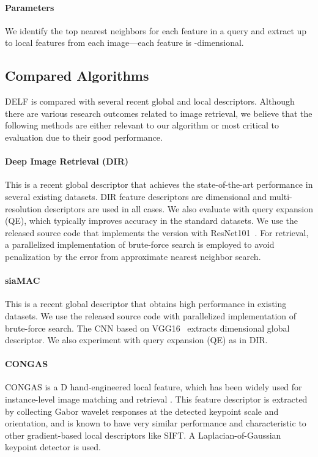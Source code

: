 \documentclass[10pt,twocolumn,letterpaper]{article}
\begin{document}
\vspace{-10pt}
\paragraph{Parameters} 
We identify the top  nearest neighbors for each feature in a query and extract up to  local features from each image---each feature is -dimensional.


\subsection{Compared Algorithms}
DELF is compared with several recent global and local descriptors.
Although there are various research outcomes related to image retrieval, we believe that the following methods are either relevant to our algorithm or most critical to evaluation due to their good performance.


\vspace{-10pt}
\paragraph{Deep Image Retrieval (DIR)~\cite{gordo2016deep}} 
This is a recent global descriptor that achieves the state-of-the-art performance in several existing datasets.  
DIR feature descriptors are  dimensional and multi-resolution descriptors are used in all cases.  
We also evaluate with query expansion (QE), which typically improves accuracy in the standard datasets.
We use the released source code that implements the version with ResNet101~\cite{he2015deep}. 
For retrieval, a parallelized implementation of brute-force search is employed to avoid penalization by the error from approximate nearest neighbor search.


\vspace{-10pt}
\paragraph{siaMAC~\cite{radenovic2016cnn}} 
This is a recent global descriptor that obtains high performance in existing datasets.  
We use the released source code with parallelized implementation of brute-force search.
The CNN based on VGG16~\cite{Simonyan15} extracts  dimensional global descriptor.  
We also experiment with query expansion (QE) as in DIR.


\vspace{-10pt}
\paragraph{CONGAS~\cite{buddemeier2012systems,neven2008image}} CONGAS is a D hand-engineered local feature, which has been widely used for instance-level image matching and retrieval \cite{aradhye2009video2text,zheng2009tour}.  
This feature descriptor is extracted by collecting Gabor wavelet responses at the detected keypoint scale and orientation, and is known to have very similar performance and characteristic to other gradient-based local descriptors like SIFT. A Laplacian-of-Gaussian keypoint detector is used.
\end{document}
